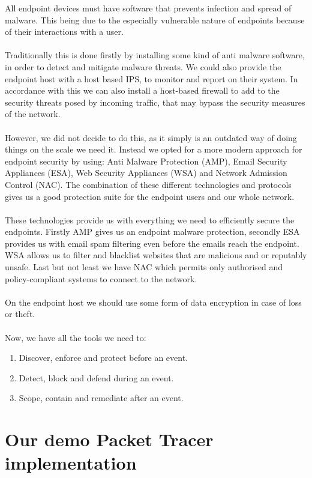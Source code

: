 All endpoint devices must have software that prevents infection and spread of malware. This being due to the especially vulnerable nature of endpoints because of their interactions with a user.
\\
\\
Traditionally this is done firstly by installing some kind of anti malware software, in order to detect and mitigate malware threats. We could also provide the endpoint host with a host based IPS, to monitor and report on their system.
In accordance with this we can also install a host-based firewall to add to the security threats posed by incoming traffic, that may bypass the security measures of the network.
\\
\\
However, we did not decide to do this, as it simply is an outdated way of doing things on the scale we need it. Instead we opted for a more modern approach for endpoint security by using:
Anti Malware Protection (AMP),
Email Security Appliances (ESA),
Web Security Appliances (WSA) 
and Network Admission Control (NAC). 
The combination of these different technologies and protocols gives us a good protection suite for the endpoint users and our whole network.
\\
\\
These technologies provide us with everything we need to efficiently secure the endpoints. Firstly AMP gives us an endpoint malware protection, secondly ESA provides us with email spam filtering even before the emails reach the endpoint.
WSA allows us to filter and blacklist websites that are malicious and or reputably unsafe. Last but not least we have NAC which permits only authorised and policy-compliant systems to connect to the network.
\\
\\
On the endpoint host we should use some form of data encryption in case of loss or theft. 
\\
\\
Now, we have all the tools we need to:
\begin{enumerate}
    \item Discover, enforce and protect before an event.
    \item Detect, block and defend during an event.
    \item Scope, contain and remediate after an event.
\end{enumerate}



\section{Our demo Packet Tracer implementation} \label{democonfigdiscussion}

